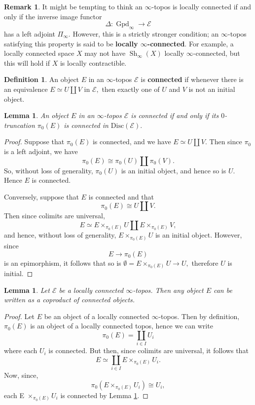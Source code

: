 \documentclass[12pt]{amsart}
\newtheorem{lemma}[dummy]{Lemma}
\theoremstyle{definition}
\newtheorem{definition}[dummy]{Definition}
\newtheorem{remark}[dummy]{Remark}
\newcommand{\cE}{\mathcal{E}}
\newcommand{\Sh}{\operatorname{Sh}}
\renewcommand{\i}{\infty}
\def\iGpd{\operatorname{Gpd}_\i}
\def\Shi{\Sh_\i}
\def\Disc{\mbox{Disc}}
\begin{document}
\begin{remark}
It might be tempting to think an $\i$-topos is locally connected if and only if the inverse image functor $$\Delta:\iGpd \to \cE$$ has a left adjoint $\Pi_\i.$ However, this is a strictly stronger condition; an $\i$-topos satisfying this property is said to be \textbf{locally $\i$-connected}. For example, a locally connected space $X$ may not have $\Shi\left(X\right)$ locally $\i$-connected, but this will hold if $X$ is locally  contractible.
\end{remark}

\begin{definition}
An object $E$ in an $\i$-topos $\cE$ is \textbf{connected} if whenever there is an equivalence $E \simeq U \coprod V$ in $\cE,$ then exactly one of $U$ and $V$ is not an initial object.
\end{definition}

\begin{lemma}\label{lem:truncated connected}
An object $E$ in an $\i$-topos $\cE$ is connected if and only if its $0$-truncation $\pi_0\left(E\right)$ is connected in $\Disc\left(\cE\right).$
\end{lemma}

\begin{proof}
Suppose that $\pi_0\left(E\right)$ is connected, and we have $E \simeq U \coprod V.$ Then since $\pi_0$ is a left adjoint, we have $$\pi_0\left(E\right) \cong \pi_0\left(U\right) \coprod \pi_0\left(V\right).$$ So, without loss of generality, $\pi_0\left(U\right)$ is an initial object, and hence so is $U.$ Hence $E$ is connected.

Conversely, suppose that $E$ is connected and that $$\pi_0\left(E\right)\cong U \coprod V.$$ Then since colimits are universal, $$E \simeq E\times_{\pi_0\left(E\right)} U \coprod E\times_{\pi_0\left(E\right)} V,$$ and hence, without loss of generality, $E\times_{\pi_0\left(E\right)} U$ is an initial object. However, since $$E \to \pi_0\left(E\right)$$ is an epimorphism, it follows that so is $\emptyset=E\times_{\pi_0\left(E\right)} U \to U,$ therefore $U$ is initial.
\end{proof}

\begin{lemma}
Let $\cE$ be a locally connected $\i$-topos. Then any object $E$ can be written as a coproduct of connected objects.
\end{lemma}

\begin{proof}
Let $E$ be an object of a locally connected $\i$-topos. Then by definition, $\pi_0\left(E\right)$ is an object of a locally connected topos, hence we can write $$\pi_0\left(E\right)=\underset{i \in I} \coprod U_i$$ where each $U_i$ is connected. But then, since colimits are universal, it follows that $$E \simeq \underset{i \in I} \coprod E \times_{\pi_0\left(E\right)} U_i.$$ Now, since, $$\pi_0\left(E \times_{\pi_0\left(E\right)} U_i\right) \cong U_i,$$ each E $\times_{\pi_0\left(E\right)} U_i$ is connected by Lemma \ref{lem:truncated connected}.
\end{proof}
\end{document}
